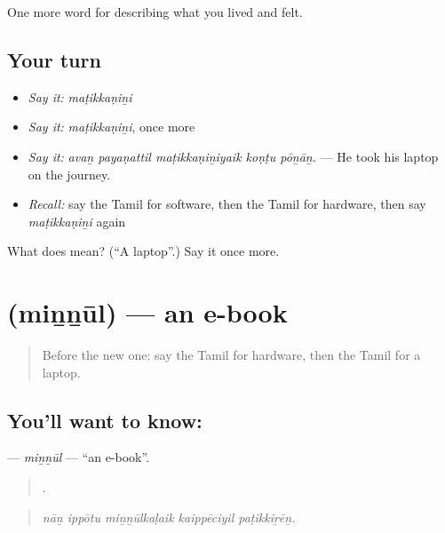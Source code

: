 \begin{grammarlens}[title={What you've built}]
One more word for describing what you lived and felt.
\end{grammarlens}

\subsection*{Your turn}
\begin{itemize}
\raggedright
  \item \emph{Say it:} \emph{maṭikkaṇiṉi}
  \item \emph{Say it:} \emph{maṭikkaṇiṉi}, once more
  \item \emph{Say it:} \emph{avaṉ payaṇattil maṭikkaṇiṉiyaik koṇṭu pōṉāṉ.} — He took his laptop on the journey.
  \item \emph{Recall:} say the Tamil for software, then the Tamil for hardware, then say \emph{maṭikkaṇiṉi} again
\end{itemize}

\begin{tcolorbox}[breakable,colback=teal!4,colframe=teal!35!black,title={Before you move on}]
What does  mean? (\textquotedblleft{}A laptop\textquotedblright{}.) Say it once more.
\end{tcolorbox}
\section[\texorpdfstring{\ta{மின்னூல்} (miṉṉūl)}{மின்னூல் (miṉṉūl)}]{ (miṉṉūl) — an e-book}

\label{lesson:TA-C515-minnul}



\begin{quote}
Before the new one: say the Tamil for hardware, then the Tamil for a laptop.
\end{quote}

\subsection*{You'll want to know: }
\textbf{} — \emph{miṉṉūl} — \textquotedblleft{}an e-book\textquotedblright{}.

\begin{quote}
    .
\end{quote}

\begin{quote}
\emph{nāṉ ippōtu miṉṉūlkaḷaik kaippēciyil paṭikkiṟēṉ.}
\end{quote}

